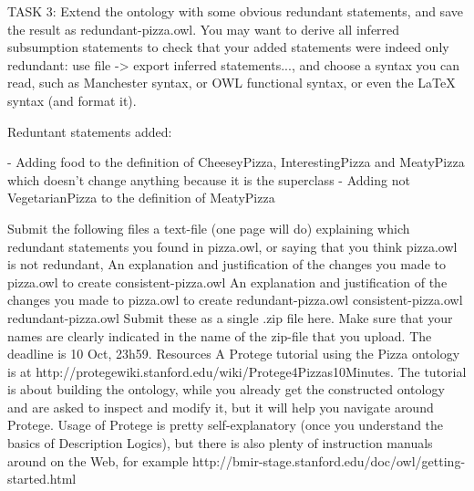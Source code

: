 TASK 3: Extend the ontology with some obvious redundant statements, and save the result as redundant-pizza.owl. You may want to derive all inferred subsumption statements to check that your added statements were indeed only redundant: use file -> export inferred statements..., and choose a syntax you can read, such as Manchester syntax, or OWL functional syntax, or even the LaTeX syntax (and format it).

Reduntant statements added:

- Adding food to the definition of CheeseyPizza, InterestingPizza and MeatyPizza which doesn’t change anything because it is the superclass
- Adding not VegetarianPizza to the definition of MeatyPizza 

Submit the following files
a text-file (one page will do) explaining
which redundant statements you found in pizza.owl, or saying that you think pizza.owl is not redundant,
An explanation and justification of the changes you made to pizza.owl to create consistent-pizza.owl
An explanation and justification of the changes you made to pizza.owl to create redundant-pizza.owl
consistent-pizza.owl
redundant-pizza.owl
Submit these as a single .zip file here. Make sure that your names are clearly indicated in the name of the zip-file that you upload. The deadline is 10 Oct, 23h59.
Resources
A Protege tutorial using the Pizza ontology is at http://protegewiki.stanford.edu/wiki/Protege4Pizzas10Minutes. The tutorial is about building the ontology, while you already get the constructed ontology and are asked to inspect and modify it, but it will help you navigate around Protege.
Usage of Protege is pretty self-explanatory (once you understand the basics of Description Logics), but there is also plenty of instruction manuals around on the Web, for example http://bmir-stage.stanford.edu/doc/owl/getting-started.html

